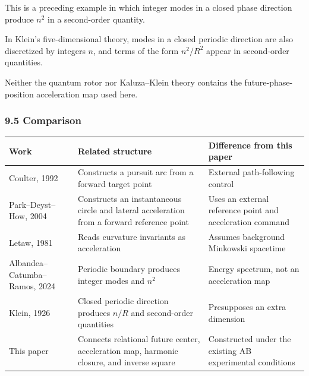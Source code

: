 \documentclass[
  a4paper,
]{article}
\newcounter{none} %
\begin{document}
This is a preceding example in which integer modes in a closed phase
direction produce \(n^2\) in a second-order quantity.

In Klein's five-dimensional theory, modes in a closed periodic direction
are also discretized by integers \(n\), and terms of the form
\(n^2/R^2\) appear in second-order quantities.

Neither the quantum rotor nor Kaluza--Klein theory contains the
future-phase-position acceleration map used here.

\subsubsection{9.5 Comparison}\label{comparison}

{\def\LTcaptype{none} %
\begin{longtable}[]{@{}
  >{\raggedright\arraybackslash}p{}
  >{\raggedright\arraybackslash}p{}
  >{\raggedright\arraybackslash}p{}@{}}
\toprule\noalign{}
\begin{minipage}[b]{\linewidth}\raggedright
Work
\end{minipage} & \begin{minipage}[b]{\linewidth}\raggedright
Related structure
\end{minipage} & \begin{minipage}[b]{\linewidth}\raggedright
Difference from this paper
\end{minipage} \\
\midrule\noalign{}
\endhead
\bottomrule\noalign{}
\endlastfoot
Coulter, 1992 & Constructs a pursuit arc from a forward target point &
External path-following control \\
Park--Deyst--How, 2004 & Constructs an instantaneous circle and lateral
acceleration from a forward reference point & Uses an external reference
point and acceleration command \\
Letaw, 1981 & Reads curvature invariants as acceleration & Assumes
background Minkowski spacetime \\
Albandea--Catumba--Ramos, 2024 & Periodic boundary produces integer
modes and \(n^2\) & Energy spectrum, not an acceleration map \\
Klein, 1926 & Closed periodic direction produces \(n/R\) and
second-order quantities & Presupposes an extra dimension \\
This paper & Connects relational future center, acceleration map,
harmonic closure, and inverse square & Constructed under the existing AB
experimental conditions \\
\end{longtable}
}
\end{document}
